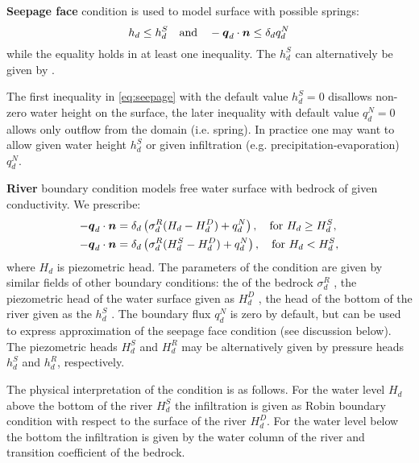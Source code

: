 {\bf Seepage face} condition is used to model surface with possible springs:
\begin{equation}\label{eq:seepage}
    h_d \le h_d^S\quad \text{and} \quad -\vc q_d \cdot \vc n \le \delta_d q_d^N
\end{equation}
while the equality holds in at least one inequality. The  
$h_d^S$  can alternatively be given by .

The first inequality in \eqref{eq:seepage}
with the default value $h_d^S=0$ disallows non-zero water height on the surface, the later
inequality with default value $q_d^N=0$ allows only outflow from the domain (i.e. spring).
In practice one may want to allow given water height $h_d^S$ or given infiltration (e.g. precipitation-evaporation) $q_d^N$.

{\bf River} boundary condition models free water surface with bedrock of given conductivity. 
We prescribe:
\begin{align}
  -\mathbf{\boldsymbol{q}}_d \cdot \mathbf{\boldsymbol{n}} &= \delta_d\left(\sigma_d^R ( H_d - H_d^D) + q_d^N\right), \quad \text{for } H_d \ge H_d^S,\\
  -\mathbf{\boldsymbol{q}}_d \cdot \mathbf{\boldsymbol{n}} &= \delta_d\left(\sigma_d^R ( H_d^S - H_d^D)+q_d^N\right), \quad \text{for } H_d < H_d^S,
\end{align}
where $H_d$ is piezometric head.
The parameters of the condition are given by similar fields of other boundary conditions: 
the  of the bedrock $\sigma_d^R$ , 
the piezometric head of the water surface given as   $H_d^D$ ,
the head of the bottom of the river given as the  
$h_d^S$ . The boundary flux $q_d^N$ is zero by default, but can be used to express approximation of the seepage face condition 
(see discussion below).  The piezometric heads  $H_d^S$ and $H_d^R$ may be alternatively 
given by pressure heads $h_d^S$ and $h_d^R$, respectively.

The physical interpretation of the condition is as follows. For the water level $H_d$ above the bottom of the river $H_d^S$ the infiltration is given 
as Robin boundary condition with respect to the surface of the river $H_d^D$. 
For the water level below the bottom the infiltration is given by the water column of the river and transition coefficient of the bedrock.

